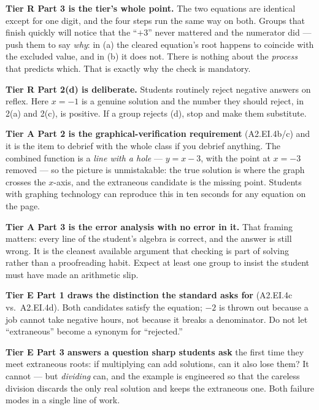 \documentclass[10pt]{article}
\begin{document}
\begin{teachernote}
\textbf{Tier R Part 3 is the tier's whole point.} The two equations are identical except for one digit,
and the four steps run the same way on both. Groups that finish quickly will notice that the ``$+3$''
never mattered and the numerator did --- push them to say \emph{why}: in (a) the cleared equation's root
happens to coincide with the excluded value, and in (b) it does not. There is nothing about the
\emph{process} that predicts which. That is exactly why the check is mandatory.

\vspace{3pt}
\textbf{Tier R Part 2(d) is deliberate.} Students routinely reject negative answers on reflex. Here
$x=-1$ is a genuine solution and the number they should reject, in 2(a) and 2(c), is positive. If a
group rejects (d), stop and make them substitute.

\vspace{3pt}
\textbf{Tier A Part 2 is the graphical-verification requirement} (A2.EI.4b/c) and it is the item to
debrief with the whole class if you debrief anything. The combined function is a \emph{line with a
hole} --- $y=x-3$, with the point at $x=-3$ removed --- so the picture is unmistakable: the true
solution is where the graph crosses the $x$-axis, and the extraneous candidate is the missing point.
Students with graphing technology can reproduce this in ten seconds for any equation on the page.

\vspace{3pt}
\textbf{Tier A Part 3 is the error analysis with no error in it.} That framing matters: every line of
the student's algebra is correct, and the answer is still wrong. It is the cleanest available argument
that checking is part of solving rather than a proofreading habit. Expect at least one group to insist
the student must have made an arithmetic slip.

\vspace{3pt}
\textbf{Tier E Part 1 draws the distinction the standard asks for} (A2.EI.4c vs.\ A2.EI.4d). Both
candidates satisfy the equation; $-2$ is thrown out because a job cannot take negative hours, not
because it breaks a denominator. Do not let ``extraneous'' become a synonym for ``rejected.''

\vspace{3pt}
\textbf{Tier E Part 3 answers a question sharp students ask} the first time they meet extraneous roots:
if multiplying can add solutions, can it also lose them? It cannot --- but \emph{dividing} can, and the
example is engineered so that the careless division discards the only real solution and keeps the
extraneous one. Both failure modes in a single line of work.
\end{teachernote}
\end{document}
